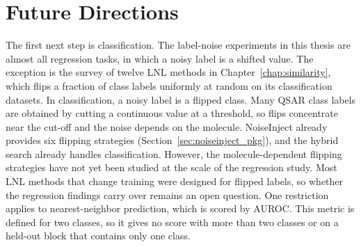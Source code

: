 \section{Future Directions}

The first next step is classification. The label-noise experiments in this thesis are almost all regression tasks, in which a noisy label is a shifted value. The exception is the survey of twelve LNL methods in Chapter~\ref{chap:similarity}, which flips a fraction of class labels uniformly at random on its classification datasets. In classification, a noisy label is a flipped class. Many QSAR class labels are obtained by cutting a continuous value at a threshold, so flips concentrate near the cut-off and the noise depends on the molecule. NoiseInject already provides six flipping strategies (Section~\ref{sec:noiseinject_pkg}), and the hybrid search already handles classification. However, the molecule-dependent flipping strategies have not yet been studied at the scale of the regression study. Most LNL methods that change training were designed for flipped labels, so whether the regression findings carry over remains an open question. One restriction applies to nearest-neighbor prediction, which is scored by AUROC. This metric is defined for two classes, so it gives no score with more than two classes or on a held-out block that contains only one class.

